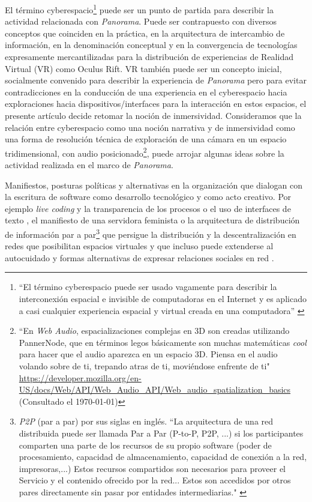 El término cyberespacio\footnote{``El término cyberespacio puede ser usado vagamente para describir la interconexión espacial e invisible de computadoras en el Internet y es aplicado a casi cualquier experiencia espacial y virtual creada en una computadora'' \citep{cyberspace}} puede ser un punto de partida para describir la actividad relacionada con \textit{Panorama}. Puede ser contrapuesto con diversos conceptos que coinciden en la práctica, en la arquitectura de intercambio de información, en la denominación conceptual y en la convergencia de tecnologías expresamente mercantilizadas para la distribución de experiencias de Realidad Virtual (VR) como Oculus Rift. VR también puede ser un concepto inicial, socialmente convenido para describir la experiencia de \textit{Panorama} pero para evitar contradicciones en la conducción de una experiencia en el cyberespacio hacia exploraciones hacia dispositivos/interfaces para la interacción en estos espacios, el presente artículo decide retomar la noción de inmersividad. Consideramos que la relación entre cyberespacio como una noción narrativa y de inmersividad como una forma de resolución técnica de exploración de una cámara en un espacio tridimensional, con audio posicionado\footnote{``En \textit{Web Audio}, espacializaciones complejas en 3D son creadas utilizando PannerNode, que en términos legos básicamente son muchas matemáticas \textit{cool} para hacer que el audio aparezca en un espacio 3D. Piensa en el audio volando sobre de ti, trepando atras de ti, moviéndose enfrente de ti" \url{https://developer.mozilla.org/en-US/docs/Web/API/Web_Audio_API/Web_audio_spatialization_basics} (Consultado el \today)}, puede arrojar algunas ideas sobre la actividad realizada en el marco de \textit{Panorama}. %

Manifiestos, posturas políticas y alternativas en la organización que dialogan con la escritura de software como desarrollo tecnológico y como acto creativo. Por ejemplo \textit{live coding} y la transparencia de los procesos o el uso de interfaces de texto \citep{collinsLivecoding}, el manifiesto de una servidora feminista \citep{feministserver} o la arquitectura de distribución de información par a par\footnote{\textit{P2P} (par a par) por sus siglas en inglés.  ``La arquitectura de una red distribuida puede ser llamada Par a Par (P-to-P, P2P, ...)   si los participantes comparten una parte de los recursos de su propio software (poder de procesamiento, capacidad de almacenamiento, capacidad de conexión a la red, impresoras,...) Estos recursos compartidos son necesarios para proveer el Servicio y el contenido ofrecido por la red... Estos son accedidos por otros pares directamente sin pasar por entidades intermediarias." \citep{p2p}} que persigue la distribución y la descentralización en redes que posibilitan espacios virtuales \citep{cyberspace} y que incluso puede extenderse al autocuidado y formas alternativas de expresar relaciones sociales en red \citep{dwc}. 

